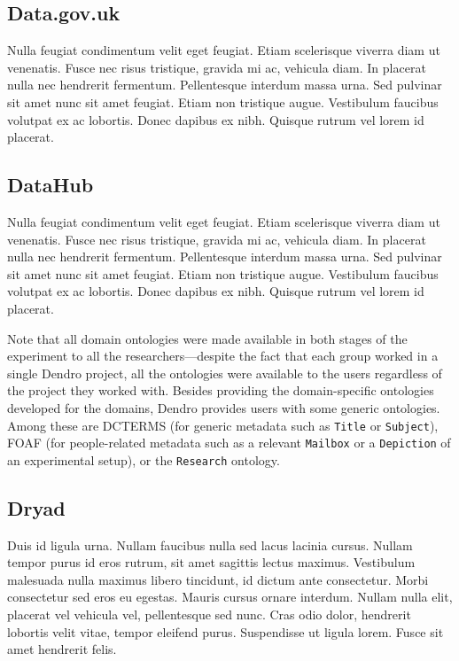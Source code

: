 \subsection{Data.gov.uk} %
\label{sub:data_gov_uk}

Nulla feugiat condimentum velit eget feugiat. Etiam scelerisque viverra diam ut venenatis. Fusce nec risus tristique, gravida mi ac, vehicula diam. In placerat nulla nec hendrerit fermentum. Pellentesque interdum massa urna. Sed pulvinar sit amet nunc sit amet feugiat. Etiam non tristique augue. Vestibulum faucibus volutpat ex ac lobortis. Donec dapibus ex nibh. Quisque rutrum vel lorem id placerat.

\subsection{DataHub} %
\label{sub:datahub}

Nulla feugiat condimentum velit eget feugiat. Etiam scelerisque viverra diam ut venenatis. Fusce nec risus tristique, gravida mi ac, vehicula diam. In placerat nulla nec hendrerit fermentum. Pellentesque interdum massa urna. Sed pulvinar sit amet nunc sit amet feugiat. Etiam non tristique augue. Vestibulum faucibus volutpat ex ac lobortis. Donec dapibus ex nibh. Quisque rutrum vel lorem id placerat.

Note that all domain ontologies were made available in both stages of the experiment to all the researchers---despite the fact that each group worked in a single Dendro project, all the ontologies were available to the users regardless of the project they worked with.
Besides providing the domain-specific ontologies developed for the domains, Dendro provides users with some generic ontologies. Among these are \gls{DCTERMS} (for generic metadata such as \texttt{Title} or \texttt{Subject}), \gls{FOAF} (for people-related metadata such as a relevant \texttt{Mailbox} or a \texttt{Depiction} of an experimental setup), or the \texttt{Research} ontology.


\subsection{Dryad} %
\label{sub:dryad}

Duis id ligula urna. Nullam faucibus nulla sed lacus lacinia cursus. Nullam tempor purus id eros rutrum, sit amet sagittis lectus maximus. Vestibulum malesuada nulla maximus libero tincidunt, id dictum ante consectetur. Morbi consectetur sed eros eu egestas. Mauris cursus ornare interdum. Nullam nulla elit, placerat vel vehicula vel, pellentesque sed nunc. Cras odio dolor, hendrerit lobortis velit vitae, tempor eleifend purus. Suspendisse ut ligula lorem. Fusce sit amet hendrerit felis.

